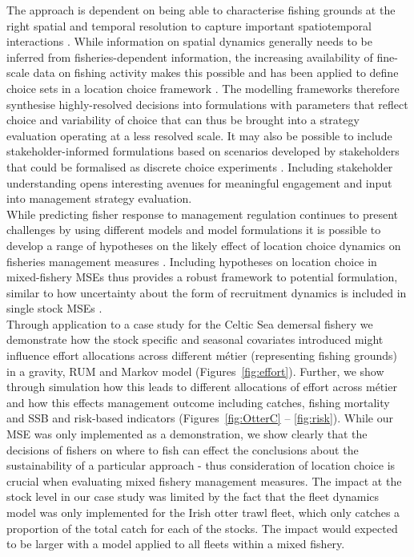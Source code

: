 \documentclass[12pt, halfline, a4paper]{ouparticle}
\begin{document}
The approach is dependent on being able to characterise fishing grounds at the
right spatial and temporal resolution to capture important spatiotemporal
interactions \citep{Dolder2020a}. While information on spatial dynamics
generally needs to be inferred from fisheries-dependent information, the
increasing availability of fine-scale data on fishing activity makes this
possible \citep{Gerritsen2012, Mateo2016} and has been applied to define choice
sets in a location choice framework \citep{Hynes2016}. The modelling frameworks
therefore synthesise highly-resolved decisions into formulations with
parameters that reflect choice and variability of choice that can thus be
brought into a strategy evaluation operating at a less resolved scale. It may
also be possible to include stakeholder-informed formulations based on
scenarios developed by stakeholders that could be formalised as discrete choice
experiments \citep{Johnson2013}. Including stakeholder understanding opens
interesting avenues for meaningful engagement and input into management
strategy evaluation.\\ 

While predicting fisher response to management regulation continues to present
challenges \citep{Andersen2010a} by using different models and model
formulations it is possible to develop a range of hypotheses on the likely
effect of location choice dynamics on fisheries management measures
\citep[][\textit{in prep}]{Dolder2020}. Including hypotheses on location choice
in mixed-fishery MSEs thus provides a robust framework to potential
formulation, similar to how uncertainty about the form of recruitment dynamics
is included in single stock MSEs \citep[e.g.][]{ICES2020}.  \\

Through application to a case study for the Celtic Sea demersal fishery we
demonstrate how the stock specific and seasonal covariates introduced might
influence effort allocations across different métier (representing fishing
grounds) in a gravity, RUM and Markov model (Figures~\ref{fig:effort}).
Further, we show through simulation how this leads to different allocations of
effort across métier and how this effects management outcome including catches,
fishing mortality and SSB and risk-based indicators (Figures~\ref{fig:OtterC}
-- \ref{fig:risk}). While our MSE was only implemented as a demonstration, we
show clearly that the decisions of fishers on where to fish can effect the
conclusions about the sustainability of a particular approach - thus
consideration of location choice is crucial when evaluating mixed fishery
management measures. The impact at the stock level in our case study was
limited by the fact that the fleet dynamics model was only implemented for the
Irish otter trawl fleet, which only catches a proportion of the total catch for
each of the stocks. The impact would expected to be larger with a model applied
to all fleets within a mixed fishery. \\
\end{document}
